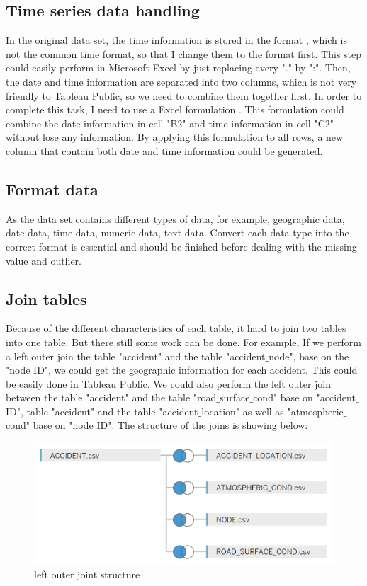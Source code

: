 \documentclass[11pt]{article}
\theoremstyle{definition}
\begin{document}
\subsection{Time series data handling}
In the original data set, the time information is stored in the format , which is not the common time format, so that I change them to the format  first. This step could easily perform in Microsoft Excel by just replacing every "." by ":". Then, the date and time information are separated into two columns, which is not very friendly to Tableau Public, so we need to combine them together first. In order to complete this task, I need to use a Excel formulation . This formulation could combine the date information in cell "B2" and time information in cell "C2" without lose any information. By applying this formulation to all rows, a new column that contain both date and time information could be generated.



\subsection{Format data}
As the data set contains different types of data, for example, geographic data, date data, time data, numeric data, text data. Convert each data type into the correct format is essential and should be finished before dealing with the missing value and outlier. 


\subsection{Join tables}
\label{JoinTable}
Because of the different characteristics of each table, it hard to join two tables into one table. But there still some work can be done. For example, If we perform a left outer join the table "accident" and the table "accident$\_$node", base on the "node ID", we could get the geographic information for each accident. This could be easily done in Tableau Public. We could also perform the left outer join between the table "accident" and  the table "road$\_$surface$\_$cond" base on "accident$\_$ID", table "accident" and the table "accident$\_$location" as well as "atmospheric$\_$cond" base on "node$\_$ID". The structure of the joins is showing below:
\begin{figure}[h!]
	\begin{center}
		\includegraphics[scale=0.8]{leftouterjoin.png} 
	\end{center}
 	\label{fig:leftOuterJoin}
\caption{left outer joint structure}
\end{figure}
\end{document}
